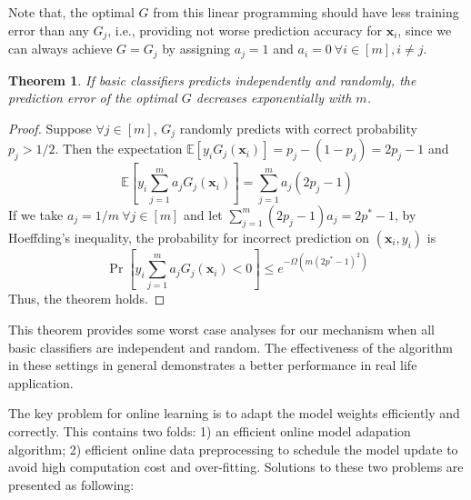 \documentclass[letterpaper]{article}
\newtheorem{theorem}{Theorem}
\begin{document}
Note that, the optimal $G$ from this linear programming should have less training error than any $G_j$, i.e.,  providing not worse prediction accuracy for $\mathbf{x}_i$, since we can always achieve $G = G_j$ by assigning $a_j = 1$ and $a_i = 0~\forall i \in [m], i \neq j$. %
\begin{theorem}
If basic classifiers predicts independently and randomly, the prediction error of the optimal $G$ decreases exponentially with $m$.
\end{theorem}
\begin{proof}
Suppose $\forall j \in [m]$, $G_j$ randomly predicts with correct probability $p_j > 1/2$. Then the expectation $\mathbb{E}[y_iG_j(\mathbf{x}_i)] = p_j - (1 - p_j) = 2p_j - 1$ and
\begin{equation}
\mathbb{E}\left[y_i\sum_{j=1}^m a_jG_j(\mathbf{x}_i)\right] = \sum_{j=1}^m a_j(2p_j - 1)
\end{equation}
If we take $a_j = 1/m~\forall j \in [m]$ and let $\sum_{j=1}^m (2p_j - 1)a_j = 2p^* - 1$, by Hoeffding's inequality, the probability for incorrect prediction on $(\mathbf{x}_i, y_i)$ is
\begin{equation}
 \Pr\left[y_i\sum_{j=1}^m a_jG_j(\mathbf{x}_i)< 0\right] \leq e^{-\Omega(m(2p^* - 1)^2)}
\end{equation}
Thus, the theorem holds.
\end{proof}
This theorem provides some worst case analyses for our mechanism when all basic classifiers are independent and random. The effectiveness of the algorithm in these settings in general demonstrates a better performance in real life application.

The key problem for online learning is to adapt the model weights efficiently and correctly. This contains two folds: 1) an efficient online model adapation algorithm; 2) efficient  online data preprocessing to schedule the model update to avoid high computation cost and over-fitting. Solutions to these two problems are presented as following:
\end{document}
